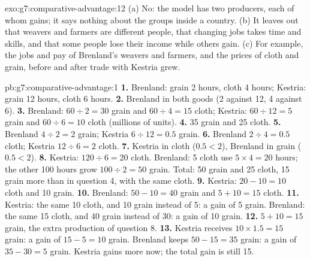 \begin{solution}{exo:g7:comparative-advantage:12}
(a) No: the model has two producers, each of whom gains; it says nothing about the
groups inside a country. (b) It leaves out that weavers and farmers are different people,
that changing jobs takes time and skills, and that some people lose their income while
others gain. (c) For example, the jobs and pay of Brenland's weavers and farmers, and the
prices of cloth and grain, before and after trade with Kestria grew.
\end{solution}

\begin{solution}{pb:g7:comparative-advantage:1}
\textbf{1.} Brenland: grain 2 hours, cloth 4 hours; Kestria: grain 12 hours, cloth 6
hours.
\textbf{2.} Brenland in both goods (2 against 12, 4 against 6).
\textbf{3.} Brenland: $60 \div 2 = 30$ grain and $60 \div 4 = 15$ cloth; Kestria: $60
\div 12 = 5$ grain and $60 \div 6 = 10$ cloth (millions of units).
\textbf{4.} 35 grain and 25 cloth.
\textbf{5.} Brenland $4 \div 2 = 2$ grain; Kestria $6 \div 12 = 0.5$ grain.
\textbf{6.} Brenland $2 \div 4 = 0.5$ cloth; Kestria $12 \div 6 = 2$ cloth.
\textbf{7.} Kestria in cloth ($0.5 < 2$), Brenland in grain ($0.5 < 2$).
\textbf{8.} Kestria: $120 \div 6 = 20$ cloth. Brenland: 5 cloth use $5 \times 4 = 20$
hours; the other 100 hours grow $100 \div 2 = 50$ grain. Total: 50 grain and 25 cloth,
15 grain more than in question 4, with the same cloth.
\textbf{9.} Kestria: $20 - 10 = 10$ cloth and 10 grain.
\textbf{10.} Brenland: $50 - 10 = 40$ grain and $5 + 10 = 15$ cloth.
\textbf{11.} Kestria: the same 10 cloth, and 10 grain instead of 5: a gain of 5 grain.
Brenland: the same 15 cloth, and 40 grain instead of 30: a gain of 10 grain.
\textbf{12.} $5 + 10 = 15$ grain, the extra production of question 8.
\textbf{13.} Kestria receives $10 \times 1.5 = 15$ grain: a gain of $15 - 5 = 10$ grain.
Brenland keeps $50 - 15 = 35$ grain: a gain of $35 - 30 = 5$ grain. Kestria gains more
now; the total gain is still 15.
\end{solution}

